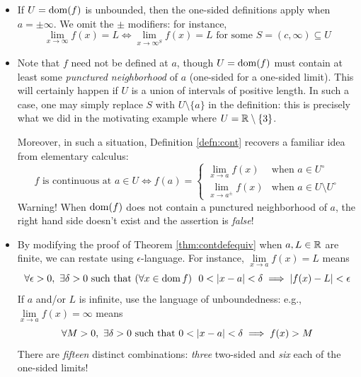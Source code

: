 \begin{itemize}
  \item If $U=\operatorname{dom}(f)$ is unbounded, then the one-sided definitions apply when $a=\pm\infty$. We omit the $\pm$ modifiers: for instance,
  \[
  	\lim_{x\to\infty}f(x)=L\iff 
  	\lim\limits_{x\to\infty^S}f(x)=L\text{ for some }
  	S=(c,\infty)\subseteq U
  \]
	\item\label{it:contlimit} Note that $f$ need not be defined at $a$, though $U=\operatorname{dom}(f)$ must contain at least some \emph{punctured neighborhood} of $a$ (one-sided for a one-sided limit). This will certainly happen if $U$ is a union of intervals of positive length. In such a case, one may simply replace $S$ with $U\setminus\{a\}$ in the definition: this is precisely what we did in the motivating example where $U=\mathbb{R}\setminus\{3\}$.\par
  Moreover, in such a situation, Definition \ref{defn:cont} recovers a familiar idea from elementary calculus:
  \[
  	f \text{ is continuous at } a\in U
  	\iff f(a)=
  	\begin{cases}
  		\lim\limits_{x\to a} f(x)&\text{when }a\in U^\circ\\
  		\lim\limits_{x\to a^\pm} f(x)&\text{when }a\in U\setminus U^\circ
  	\end{cases}
  	\tag{$\ast$}
 	\]
 	Warning! When $\operatorname{dom}(f)$ does not contain a punctured neighborhood of $a$, the right hand side doesn't exist and the assertion is \emph{false}!
  \item By modifying the proof of Theorem \ref{thm:contdefequiv} when $a,L\in\mathbb{R}$ are finite, we can restate using $\epsilon$-language. For instance, $\lim\limits_{x\to a}f(x)=L$ means
  \[
  	\forall\epsilon>0,\ \exists \delta>0\text{ such that }(\forall x\in\dom f) \ \ 0<\nm{x-a}<\delta\implies \nm{f(x)-L}<\epsilon
  \]
  If $a$ and/or $L$ is infinite, use the language of unboundedness: e.g., $\lim\limits_{x\to a}f(x)=\infty$ means
  \[
  	\forall M>0,\ \exists \delta>0\text{ such that }0<\left| x-a\right|<\delta\implies f(x)>M
  \]
  There are \emph{fifteen} distinct combinations: \emph{three} two-sided and \emph{six} each of the one-sided limits!
\end{itemize}
\goodbreak


